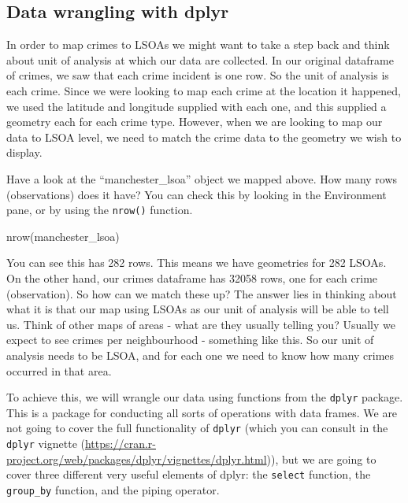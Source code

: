\documentclass[
]{book}
\newenvironment{Shaded}{\begin{snugshade}}{\end{snugshade}}
\newcommand{\FunctionTok}[1]{\textcolor[rgb]{0.00,0.00,0.00}{#1}}
\newcommand{\NormalTok}[1]{#1}
\begin{document}
\hypertarget{data-wrangling-with-dplyr}{%
\subsection{Data wrangling with dplyr}\label{data-wrangling-with-dplyr}}

In order to map crimes to LSOAs we might want to take a step back and think about unit of analysis at which our data are collected. In our original dataframe of crimes, we saw that each crime incident is one row. So the unit of analysis is each crime. Since we were looking to map each crime at the location it happened, we used the latitude and longitude supplied with each one, and this supplied a geometry each for each crime type. However, when we are looking to map our data to LSOA level, we need to match the crime data to the geometry we wish to display.

Have a look at the ``manchester\_lsoa'' object we mapped above. How many rows (observations) does it have? You can check this by looking in the Environment pane, or by using the \texttt{nrow()} function.

\begin{Shaded}
\begin{Highlighting}[]
\FunctionTok{nrow}\NormalTok{(manchester\_lsoa)}
\end{Highlighting}
\end{Shaded}

You can see this has 282 rows. This means we have geometries for 282 LSOAs. On the other hand, our crimes dataframe has 32058 rows, one for each crime (observation). So how can we match these up? The answer lies in thinking about what it is that our map using LSOAs as our unit of analysis will be able to tell us. Think of other maps of areas - what are they usually telling you? Usually we expect to see crimes per neighbourhood - something like this. So our unit of analysis needs to be LSOA, and for each one we need to know how many crimes occurred in that area.

To achieve this, we will wrangle our data using functions from the \texttt{dplyr} package. This is a package for conducting all sorts of operations with data frames. We are not going to cover the full functionality of \texttt{dplyr} (which you can consult in the \texttt{dplyr} vignette (\url{https://cran.r-project.org/web/packages/dplyr/vignettes/dplyr.html})), but we are going to cover three different very useful elements of dplyr: the \texttt{select} function, the \texttt{group\_by} function, and the piping operator.
\end{document}
